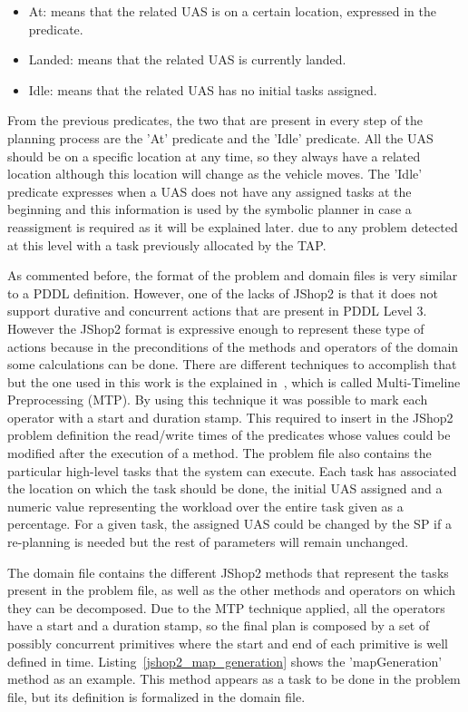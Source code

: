 \documentclass[twocolumn]{svjour3}          %
\begin{document}
\begin{itemize}
  \item At: means that the related UAS is on a certain location, expressed in the predicate.
  \item Landed: means that the related UAS is currently landed.
  \item Idle: means that the related UAS has no initial tasks assigned.
\end{itemize}

From the previous predicates, the two that are present in every step of the planning process are the 'At' predicate and the 'Idle' predicate. All the UAS should be on a specific location at any time, so they always have a related location although this location will change as the vehicle moves. The 'Idle' predicate expresses when a UAS does not have any assigned tasks at the beginning and this information is used by the symbolic planner in case a reassigment is required as it will be explained later. due to any problem detected at this level with a task previously allocated by the TAP.

As commented before, the format of the problem and domain files is very similar to a PDDL definition. However, one of the lacks of JShop2 is that it does not support durative and concurrent actions that are present in PDDL Level 3. However the JShop2 format is expressive enough to represent these type of actions because in the preconditions of the methods and operators of the domain some calculations can be done. There are different techniques to accomplish that but the one used in this work is the explained in~\cite{Nau03shop2}, which is called Multi-Timeline Preprocessing (MTP). By using this technique it was possible to mark each operator with a start and duration stamp. This required to insert in the JShop2 problem definition the read/write times of the predicates whose values could be modified after the execution of a method. The problem file also contains the particular high-level tasks that the system can execute. Each task has associated the location on which the task should be done, the initial UAS assigned and a numeric value representing the workload over the entire task given as a percentage. For a given task, the assigned UAS could be changed by the SP if a re-planning is needed but the rest of parameters will remain unchanged.

The domain file contains the different JShop2 methods that represent the tasks present in the problem file, as well as the other methods and operators on which they can be decomposed. Due to the MTP technique applied, all the operators have a start and a duration stamp, so the final plan is composed by a set of possibly concurrent primitives where the start and end of each primitive is well defined in time.  Listing~\ref{jshop2_map_generation} shows the 'mapGeneration' method as an example. This method appears as a task to be done in the problem file, but its definition is formalized in the domain file.
\end{document}
